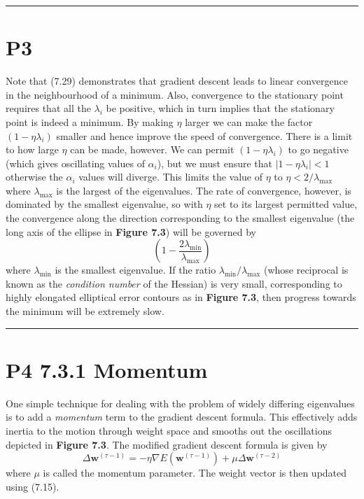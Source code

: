 \documentclass{article}
\begin{document}
\noindent\rule{\linewidth}{0.4pt}

\section{P3}

Note that (7.29) demonstrates that gradient descent leads to linear convergence in the neighbourhood of a minimum. Also, convergence to the stationary point requires that all the $\lambda_i$ be positive, which in turn implies that the stationary point is indeed a minimum. By making $\eta$ larger we can make the factor $(1 - \eta \lambda_i)$ smaller and hence improve the speed of convergence. There is a limit to how large $\eta$ can be made, however. We can permit $(1 - \eta \lambda_i)$ to go negative (which gives oscillating values of $\alpha_i$), but we must ensure that $|1 - \eta \lambda_i| < 1$ otherwise the $\alpha_i$ values will diverge. This limits the value of $\eta$ to $\eta < 2 / \lambda_{\max}$ where $\lambda_{\max}$ is the largest of the eigenvalues. The rate of convergence, however, is dominated by the smallest eigenvalue, so with $\eta$ set to its largest permitted value, the convergence along the direction corresponding to the smallest eigenvalue (the long axis of the ellipse in \textbf{Figure 7.3}) will be governed by
\begin{equation}
\left(1 - \frac{2 \lambda_{\min}}{\lambda_{\max}}\right)
\tag{7.30}
\end{equation}
where $\lambda_{\min}$ is the smallest eigenvalue. If the ratio $\lambda_{\min} / \lambda_{\max}$ (whose reciprocal is known as the \emph{condition number} of the Hessian) is very small, corresponding to highly elongated elliptical error contours as in \textbf{Figure 7.3}, then progress towards the minimum will be extremely slow.

\noindent\rule{\linewidth}{0.4pt}

\section{P4 7.3.1 Momentum}

One simple technique for dealing with the problem of widely differing eigenvalues is to add a \emph{momentum} term to the gradient descent formula. This effectively adds inertia to the motion through weight space and smooths out the oscillations depicted in \textbf{Figure 7.3}. The modified gradient descent formula is given by
\begin{equation}
\Delta \mathbf{w}^{(\tau-1)} = -\eta \nabla E\left(\mathbf{w}^{(\tau-1)}\right) + \mu \Delta \mathbf{w}^{(\tau-2)}
\tag{7.31}
\end{equation}
where $\mu$ is called the momentum parameter. The weight vector is then updated using (7.15).
\end{document}
